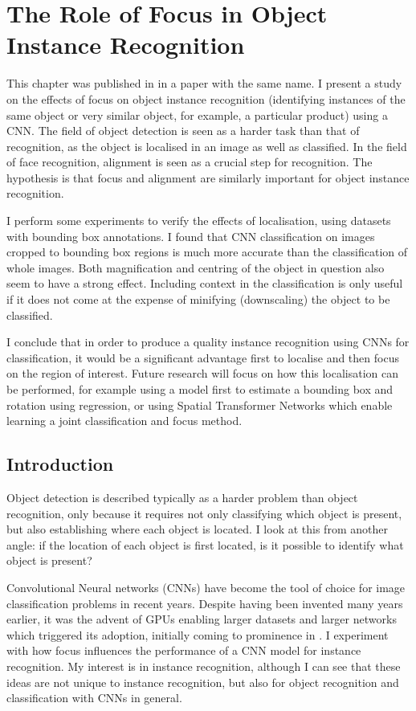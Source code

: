 \chapter{The Role of Focus in Object Instance Recognition}
\label{chap:focus}

This chapter was published in \cite{Batchelor2017} in a paper with the same name. I present a study on the effects of focus on object instance recognition (identifying instances of the same object or very similar object, for example, a particular product) using a \gls{CNN}. The field of object detection is seen as a harder task than that of recognition, as the object is localised in an image as well as classified. In the field of face recognition, alignment is seen as a crucial step for recognition. The hypothesis is that focus and alignment are similarly important for object instance recognition. 

I perform some experiments to verify the effects of localisation, using datasets with bounding box annotations. I found that CNN classification on images cropped to bounding box regions is much more accurate than the classification of whole images. Both magnification and centring of the object in question also seem to have a strong effect. Including context in the classification is only useful if it does not come at the expense of minifying (downscaling) the object to be classified.
 
I conclude that in order to produce a quality instance recognition using \gls{CNN}s for classification, it would be a significant advantage first to localise and then focus on the region of interest. Future research will focus on how this localisation can be performed, for example using a model first to estimate a bounding box and rotation using regression, or using Spatial Transformer Networks which enable learning a joint classification and focus method.

\section{Introduction}

Object detection is described typically as a harder problem than object recognition, only because it requires not only classifying which object is present, but also establishing where each object is located. I look at this from another angle: if the location of each object is first located, is it possible to identify what object is present? 

Convolutional Neural networks (\gls{CNN}s) \cite{LeCun1998} have become the tool of choice for image classification problems in recent years. Despite having been invented many years earlier, it was the advent of \gls{GPU}s enabling larger datasets and larger networks which triggered its adoption, initially coming to prominence in \cite {Krizhevsky2012}.  I experiment with how focus influences the performance of a CNN model for instance recognition. My interest is in instance recognition, although I can see that these ideas are not unique to instance recognition, but also for object recognition and classification with \gls{CNN}s in general.

